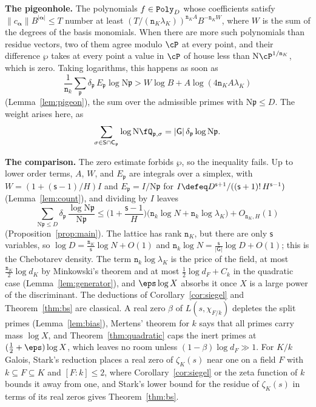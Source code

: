 \documentclass[11pt, reqno, twoside, letterpaper]{amsart}
\newcommand{\va}{\boldsymbol{\alpha}}
\newcommand{\house}[1]{\lVert #1\rVert}
\newcommand{\Nm}{\mathrm{N}}
\newcommand{\fp}{\mathfrak{p}}
\newcommand{\dk}{{\mathtt{n}_k}}
\newcommand{\dK}{{\mathtt{n}_K}}
\newcommand{\wgt}{H}
\newcommand{\bxs}{N}
\newcommand{\dgb}{D}
\newcommand{\XX}{X}
\newcommand{\hB}{B}
\newcommand{\lamK}{\lambda_{\Kf}}
\newcommand{\hgt}{T}
\newcommand{\galKk}{\mathsf{G}}
\newcommand{\Kf}{K}
\newcommand{\poly}{\wp}
\newcommand{\PolyD}{{\tt Poly}_\dgb}
\newcommand{\rr}{A}
\newcommand{\Ew}{E}
\newcommand{\modl}{\cP}
\newcommand{\Ic}{I}
\newcommand{\wt}{\delta}
\newcommand{\Sset}{\mathsf{S}}
\newcommand{\nS}{\mathsf{s}}
\newcommand{\cls}{\mathsf{C}}
\begin{document}
\medskip\noindent\textbf{The pigeonhole.}
The polynomials $f\in\PolyD$ whose coefficients satisfy
$\house{c_{\va}}\hB^{|\va|}\le\hgt$ number at least
$(\hgt/(\dK\lamK))^{\dK\rr}\hB^{-\dK W}$, where $W$ is the sum of the
degrees of the basis monomials. When there are more such polynomials
than residue vectors, two of them agree modulo $\modl$ at every point,
and their difference $\poly$ takes at every point a value in $\modl$
of house less than $\Nm\modl^{1/\dK}$, which is zero. Taking
logarithms, this happens as soon as
\[
\frac1{\dk}\sum_{\fp}\wt_\fp\,\Ew_\fp\log\Nm\fp
>W\log\hB+\rr\log(4\dK\rr\lamK)
\]
(Lemma~\ref{lem:pigeon}), the sum over the admissible primes with
$\Nm\fp\le\dgb$. The weight arises here, as
\[
\sum_{\sigma\in\Sset\cap\cls_\fp}\log\Nm\fQ_{\fp,\sigma}
=|\galKk|\,\wt_\fp\log\Nm\fp .
\]

\medskip\noindent\textbf{The comparison.}
The zero estimate forbids $\poly$, so the inequality fails. Up to
lower order terms, $\rr$, $W$, and $\Ew_\fp$ are integrals over a
simplex, with $W=(1+(\nS-1)/\wgt)\Ic$ and $\Ew_\fp=\Ic/\Nm\fp$ for
$\Ic\defeq\dgb^{\nS+1}/((\nS+1)!\,\wgt^{\nS-1})$
(Lemma~\ref{lem:count}), and dividing by $\Ic$ leaves
\[
\sum_{\Nm\fp\le\dgb}\wt_\fp\,\frac{\log\Nm\fp}{\Nm\fp}
\le\Big(1+\frac{\nS-1}{\wgt}\Big)
\big(\dk\log\bxs+\dk\log\lamK\big)+O_{\dK,\wgt}(1)
\]
(Proposition~\ref{prop:main}). The lattice has rank $\dK$, but there
are only $\nS$ variables, so $\log\dgb=\frac{\dK}{\nS}\log\bxs+O(1)$
and $\dk\log\bxs=\frac{\nS}{|\galKk|}\log\dgb+O(1)$; this is the
Chebotarev density. The term $\dk\log\lamK$ is the price of the
field, at most $\frac{\dK}{2}\log d_\Kf$ by Minkowski's theorem and
at most $\frac12\log d_F+C_k$ in the quadratic case
(Lemma~\ref{lem:generator}), and $\eps\log\XX$ absorbs it once $\XX$
is a large power of the discriminant. The deductions of
Corollary~\ref{cor:siegel} and Theorem~\ref{thm:bs} are classical. A
real zero $\beta$ of
$L(s,\chi_{F/k})$ depletes the split primes (Lemma~\ref{lem:bias}),
Mertens' theorem for $k$ says that all primes carry mass $\log\XX$,
and Theorem~\ref{thm:quadratic} caps the inert primes at
$(\tfrac12+\eps)\log\XX$, which leaves no room unless
$(1-\beta)\log d_F\gg 1$. For $\Kf/k$ Galois, Stark's reduction
places a real zero of $\zeta_\Kf(s)$ near one on a field $F$ with
$k\subseteq F\subseteq\Kf$ and $[F:k]\le 2$, where
Corollary~\ref{cor:siegel} or the zeta function of $k$ bounds it
away from one, and Stark's lower bound for the residue of
$\zeta_\Kf(s)$ in terms of its real zeros gives Theorem~\ref{thm:bs}.
\end{document}
